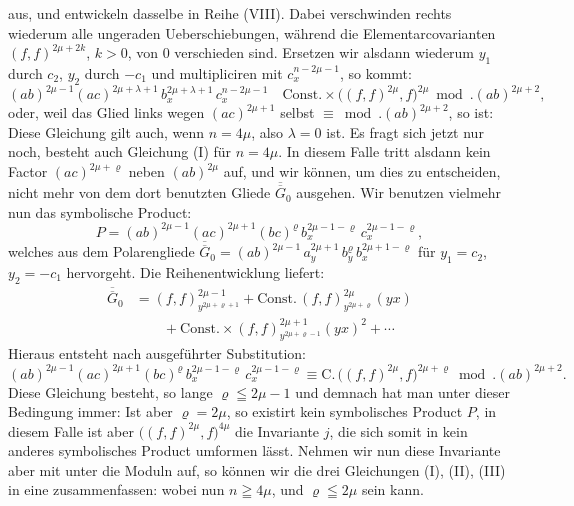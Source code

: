 aus, und entwickeln dasselbe in Reihe (VIII). Dabei verschwinden
rechts wiederum alle ungeraden Ueberschiebungen, während die Elementarcovarianten
$(f,f)^{2\mu+2k}$, $k > 0$, von 0 verschieden sind.
Ersetzen wir alsdann wiederum $y_1$ durch $c_2$, $y_2$ durch $-c_1$ und multipliciren
mit $c_x^{n-2\mu-1}$, so kommt:
\[
(ab)^{2\mu-1}(ac)^{2\mu+\lambda+1}\,b_x^{2\mu+\lambda+1}\,c_x^{n-2\mu-1}
\quad \text{Const.}\times \big((f,f)^{2\mu}, f\big)^{2\mu} \bmod. (ab)^{2\mu+2}, %
\]
oder, weil das Glied links wegen $(ac)^{2\mu+1}$ selbst $\equiv \bmod. (ab)^{2\mu+2}$, so ist:
Diese Gleichung gilt auch, wenn $n = 4\mu$, also $\lambda = 0$ ist. Es
fragt sich jetzt nur noch, besteht auch Gleichung (I) für $n = 4\mu$.
In diesem Falle tritt alsdann kein Factor $(ac)^{2\mu+\varrho}$ neben $(ab)^{2\mu}$ auf,
und wir können, um dies zu entscheiden, nicht mehr von dem dort
benutzten Gliede $\overline{\overline{G}}_0$ ausgehen. Wir benutzen vielmehr nun das symbolische
Product:
\[
P = (ab)^{2\mu-1}(ac)^{2\mu+1}(bc)^\varrho\,b_x^{2\mu-1-\varrho}\,c_x^{2\mu-1-\varrho},
\]
welches aus dem Polarengliede $\overline{\overline{G}}_0 = (ab)^{2\mu-1}\,a_y^{2\mu+1}\,b_y^\varrho\,b_x^{2\mu+1-\varrho}$ für $y_1 = c_2$,
$y_2 = -c_1$ hervorgeht. Die Reihenentwicklung liefert:
\[
\begin{aligned}
\overline{\overline{G}}_0 &= (f,f)^{2\mu-1}_{y^{2\mu+\varrho+1}} + \text{Const.}\,(f,f)^{2\mu}_{y^{2\mu+\varrho}}(yx) \\
&\qquad + \text{Const.}\times (f,f)^{2\mu+1}_{y^{2\mu+\varrho-1}}(yx)^2 + \cdots
\end{aligned}
\]
Hieraus entsteht nach ausgeführter Substitution:
\[
(ab)^{2\mu-1}(ac)^{2\mu+1}(bc)^\varrho\,b_x^{2\mu-1-\varrho}\,c_x^{2\mu-1-\varrho}
\equiv \text{C.}\,\big((f,f)^{2\mu}, f\big)^{2\mu+\varrho} \bmod. (ab)^{2\mu+2}.
\]
Diese Gleichung besteht, so lange $\varrho \leqq 2\mu - 1$ und demnach hat
man unter dieser Bedingung immer:
Ist aber $\varrho = 2\mu$, so existirt kein symbolisches Product $P$, in
diesem Falle ist aber $\big((f,f)^{2\mu}, f\big)^{4\mu}$ die Invariante $j$, die sich somit
in kein anderes symbolisches Product umformen lässt. Nehmen wir
nun diese Invariante aber mit unter die Moduln auf, so können wir
die drei Gleichungen (I), (II), (III) in eine zusammenfassen:
wobei nun $n \geqq 4\mu$, und $\varrho \leqq 2\mu$ sein kann.


